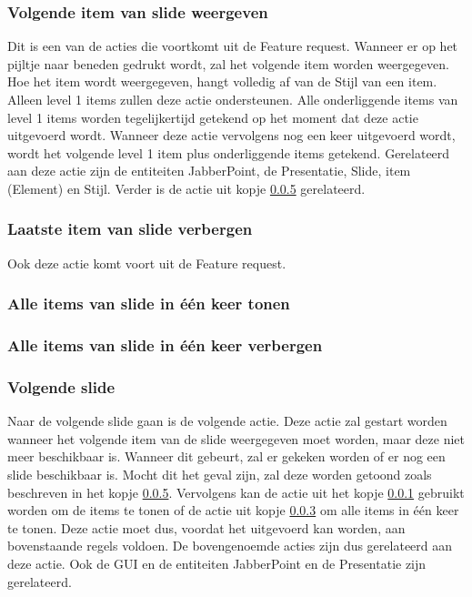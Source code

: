 \documentclass[a4paper]{article}
\begin{document}
\subsubsection{Volgende item van slide weergeven}
\label{subsub:volgendeItem}
Dit is een van de acties die voortkomt uit de Feature request. Wanneer er op het pijltje naar beneden gedrukt wordt, zal het volgende item worden weergegeven. Hoe het item wordt weergegeven, hangt volledig af van de Stijl van een item. Alleen level 1 items zullen deze actie ondersteunen. Alle onderliggende items van level 1 items worden tegelijkertijd getekend op het moment dat deze actie uitgevoerd wordt. Wanneer deze actie vervolgens nog een keer uitgevoerd wordt, wordt het volgende level 1 item plus onderliggende items getekend. Gerelateerd aan deze actie zijn de entiteiten JabberPoint, de Presentatie, Slide, item (Element) en Stijl. Verder is de actie uit kopje \ref{subsub:volgendeSlide} gerelateerd.

\subsubsection{Laatste item van slide verbergen}
Ook deze actie komt voort uit de Feature request.

\subsubsection{Alle items van slide in \'{e}\'{e}n keer tonen}
\label{subsub:alleItems}

\subsubsection{Alle items van slide in \'{e}\'{e}n keer verbergen}

\subsubsection{Volgende slide}
\label{subsub:volgendeSlide}
Naar de volgende slide gaan is de volgende actie. Deze actie zal gestart worden wanneer het volgende item van de slide weergegeven moet worden, maar deze niet meer beschikbaar is. Wanneer dit gebeurt, zal er gekeken worden of er nog een slide beschikbaar is. Mocht dit het geval zijn, zal deze worden getoond zoals beschreven in het kopje \ref{subsub:volgendeSlide}. Vervolgens kan de actie uit het kopje \ref{subsub:volgendeItem} gebruikt worden om de items te tonen of de actie uit kopje \ref{subsub:alleItems} om alle items in \'{e}\'{e}n keer te tonen. Deze actie moet dus, voordat het uitgevoerd kan worden, aan bovenstaande regels voldoen. De bovengenoemde acties zijn dus gerelateerd aan deze actie. Ook de GUI en de entiteiten JabberPoint en de Presentatie zijn gerelateerd.
\end{document}
